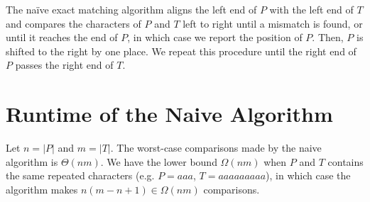 The na\"ive exact matching algorithm aligns the left end of $P$ with the left end of $T$ and compares the characters of $P$ and $T$ left to right until a mismatch is found, or until it reaches the end of $P$, in which case we report the position of $P$. Then, $P$ is shifted to the right by one place. We repeat this procedure until the right end of $P$ passes the right end of $T$.

\section{Runtime of the Naive Algorithm}

Let $n = |P|$ and $m = |T|$. The worst-case comparisons made by the naive algorithm is $\Theta(nm)$. We have the lower bound $\Omega(nm)$ when
$P$ and $T$ contains the same repeated characters (e.g. $P = aaa$, $T = aaaaaaaaa$), in which case the algorithm makes $n(m-n+1) \in \Omega(nm)$ comparisons.